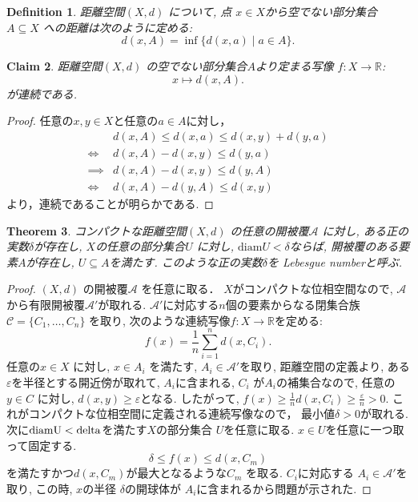 \documentclass[lualatex]{ltjsbook}
\newtheorem{theorem}{Theorem}[section]
\newtheorem{definition}[theorem]{Definition}
\newtheorem{claim}[theorem]{Claim}
\theoremstyle{remark}
\theoremstyle{plain}
\begin{document}
\begin{definition}
	距離空間$\left( X ,d \right) $ について, 点 $x \in  X$から空でない部分集合 $  A \subseteq X$ への距離は次のように定める:
	\[
	d\left( x,A \right) = \inf  \{d\left( x,a \right)  \mid a \in A\} 
	.\] 
\end{definition}

\begin{claim}
	距離空間$\left( X ,d \right) $ の空でない部分集合$A$より定まる写像 $f: X \to \mathbb{R}$:
	\[
	x \mapsto d(x,A)
	.\] 
が連続である.
\end{claim}

\begin{proof}
	任意の$x,y \in X$と任意の$a \in A$に対し，
	\[
	\begin{aligned}
		& d\left( x,A \right)   \le d(x,a) \le d(x,y) + d(y,a)\\
		\iff &d(x,A) - d(x,y)  \le d(y,a) \\
		\implies &d(x,A) -d(x,y) \le d(y,A)\\
		\iff & d(x,A) -d(y,A) \le d(x,y)
	\end{aligned}
	\] 
	より，連続であることが明らかである.
\end{proof}


\begin{theorem}
	コンパクトな距離空間$\left( X,d \right) $ の任意の開被覆$\mathcal{A}$ に対し, 
	ある正の実数$\delta$が存在し, $X$の任意の部分集合$U$ に対し, $\mathrm{diam}U < \delta$ならば, 開被覆のある要素$A$が存在し, $U \subseteq A$を満たす.
	このような正の実数$\delta$を Lebesgue numberと呼ぶ.
\end{theorem}

\begin{proof}
	$\left( X,d \right) $ の開被覆$\mathcal{A}$ を任意に取る．
	$X$がコンパクトな位相空間なので,  $\mathcal{A}$ から有限開被覆$\mathcal{A}'$が取れる. $\mathcal{A}'$に対応する$n$個の要素からなる閉集合族$\mathcal{C} = \{C_1, \ldots , C_{n}\} $ を取り, 次のような連続写像$f: X \to \mathbb{R}$を定める:
	\[
		f(x) = \frac{1}{n}\sum_{i =1}^n d(x,C_i)
	.\]
	任意の$x \in X $ に対し, 
	$x \in A_i$ を満たす, $A_i \in \mathcal{A}'$を取り, 
	距離空間の定義より, ある$\varepsilon$を半径とする開近傍が取れて,
	$A_i$に含まれる,
	$C_i$ が$A_i$の補集合なので, 
	任意の $y \in C$ に対し,  $d(x,y) \ge \varepsilon$となる. 
	したがって, 
	$f(x) \ge \frac{1}{n}d(x,C_i) \ge \frac{\varepsilon}{n}>0$.
	これがコンパクトな位相空間に定義される連続写像なので， 最小値$\delta >0$が取れる.
	次に$\rm{diam}U<delta$を満たす$X$の部分集合 $U$を任意に取る.  $x \in U$を任意に一つ取って固定する.
	 $$\delta \le f(x) \le d(x,C_m)$$
	  を満たすかつ$d(x,C_m)$が最大となるような$C_m$ を取る.
	  $C_i$に対応する $A_i \in \mathcal{A}'$を取り, この時, $x$の半径 $\delta$の開球体が $A_i$に含まれるから問題が示された.
\end{proof}
\end{document}
